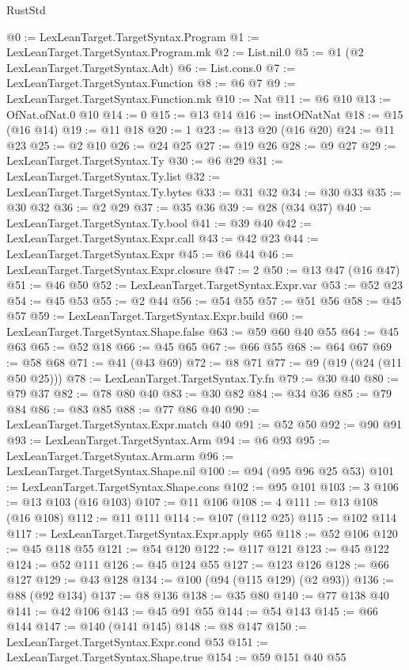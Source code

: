 \begin{lexlean}{RustStd}
\begin{coremodule}
@0 := LexLeanTarget.TargetSyntax.Program
@1 := LexLeanTarget.TargetSyntax.Program.mk
@2 := List.nil.{0}
@5 := @1 (@2 LexLeanTarget.TargetSyntax.Adt)
@6 := List.cons.{0}
@7 := LexLeanTarget.TargetSyntax.Function
@8 := @6 @7
@9 := LexLeanTarget.TargetSyntax.Function.mk
@10 := Nat
@11 := @6 @10
@13 := OfNat.ofNat.{0} @10
@14 := 0
@15 := @13 @14
@16 := instOfNatNat
@18 := @15 (@16 @14)
@19 := @11 @18
@20 := 1
@23 := @13 @20 (@16 @20)
@24 := @11 @23
@25 := @2 @10
@26 := @24 @25
@27 := @19 @26
@28 := @9 @27
@29 := LexLeanTarget.TargetSyntax.Ty
@30 := @6 @29
@31 := LexLeanTarget.TargetSyntax.Ty.list
@32 := LexLeanTarget.TargetSyntax.Ty.bytes
@33 := @31 @32
@34 := @30 @33
@35 := @30 @32
@36 := @2 @29
@37 := @35 @36
@39 := @28 (@34 @37)
@40 := LexLeanTarget.TargetSyntax.Ty.bool
@41 := @39 @40
@42 := LexLeanTarget.TargetSyntax.Expr.call
@43 := @42 @23
@44 := LexLeanTarget.TargetSyntax.Expr
@45 := @6 @44
@46 := LexLeanTarget.TargetSyntax.Expr.closure
@47 := 2
@50 := @13 @47 (@16 @47)
@51 := @46 @50
@52 := LexLeanTarget.TargetSyntax.Expr.var
@53 := @52 @23
@54 := @45 @53
@55 := @2 @44
@56 := @54 @55
@57 := @51 @56
@58 := @45 @57
@59 := LexLeanTarget.TargetSyntax.Expr.build
@60 := LexLeanTarget.TargetSyntax.Shape.false
@63 := @59 @60 @40 @55
@64 := @45 @63
@65 := @52 @18
@66 := @45 @65
@67 := @66 @55
@68 := @64 @67
@69 := @58 @68
@71 := @41 (@43 @69)
@72 := @8 @71
@77 := @9 (@19 (@24 (@11 @50 @25)))
@78 := LexLeanTarget.TargetSyntax.Ty.fn
@79 := @30 @40
@80 := @79 @37
@82 := @78 @80 @40
@83 := @30 @82
@84 := @34 @36
@85 := @79 @84
@86 := @83 @85
@88 := @77 @86 @40
@90 := LexLeanTarget.TargetSyntax.Expr.match @40
@91 := @52 @50
@92 := @90 @91
@93 := LexLeanTarget.TargetSyntax.Arm
@94 := @6 @93
@95 := LexLeanTarget.TargetSyntax.Arm.arm
@96 := LexLeanTarget.TargetSyntax.Shape.nil
@100 := @94 (@95 @96 @25 @53)
@101 := LexLeanTarget.TargetSyntax.Shape.cons
@102 := @95 @101
@103 := 3
@106 := @13 @103 (@16 @103)
@107 := @11 @106
@108 := 4
@111 := @13 @108 (@16 @108)
@112 := @11 @111
@114 := @107 (@112 @25)
@115 := @102 @114
@117 := LexLeanTarget.TargetSyntax.Expr.apply @65
@118 := @52 @106
@120 := @45 @118 @55
@121 := @54 @120
@122 := @117 @121
@123 := @45 @122
@124 := @52 @111
@126 := @45 @124 @55
@127 := @123 @126
@128 := @66 @127
@129 := @43 @128
@134 := @100 (@94 (@115 @129) (@2 @93))
@136 := @88 (@92 @134)
@137 := @8 @136
@138 := @35 @80
@140 := @77 @138 @40
@141 := @42 @106
@143 := @45 @91 @55
@144 := @54 @143
@145 := @66 @144
@147 := @140 (@141 @145)
@148 := @8 @147
@150 := LexLeanTarget.TargetSyntax.Expr.cond @53
@151 := LexLeanTarget.TargetSyntax.Shape.true
@154 := @59 @151 @40 @55

\end{coremodule}
\end{lexlean}
